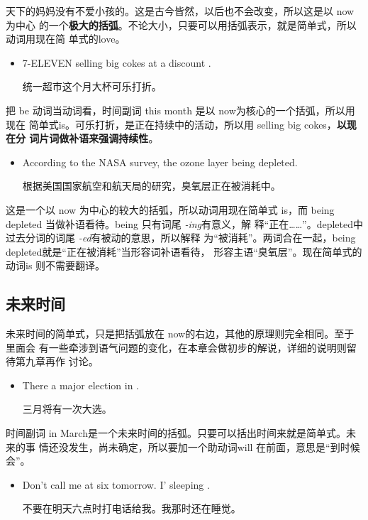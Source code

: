 天下的妈妈没有不爱小孩的。这是古今皆然，以后也不会改变，所以这是以 now为中心
的一个\textbf{极大的括弧}。不论大小，只要可以用括弧表示，就是简单式，所以动词用现在简
单式的love。

\begin{itemize}
\item  7-ELEVEN  selling big cokes at a discount .

  统一超市这个月大杯可乐打折。
\end{itemize}

把 be 动词当动词看，时间副词 this month 是以 now为核心的一个括弧，所以用现在
简单式is。可乐打折，是正在持续中的活动，所以用 selling big cokes，\textbf{以现在分
  词片词做补语来强调持续性}。

\begin{itemize}
\item According to the NASA survey, the ozone layer  being depleted.

  根据美国国家航空和航天局的研究，臭氧层正在被消耗中。
\end{itemize}

这是一个以 now 为中心的较大的括弧，所以动词用现在简单式 is，而 being
depleted 当做补语看待。being 只有词尾 \emph{-ing}有意义，解
释“正在……”。depleted中过去分词的词尾 \emph{-ed}有被动的意思，所以解释
为“被消耗”。两词合在一起，being depleted就是“正在被消耗”当形容词补语看待，
形容主语“臭氧层”。现在简单式的动词is 则不需要翻译。

\subsection{未来时间}

未来时间的简单式，只是把括弧放在 now的右边，其他的原理则完全相同。至于里面会
有一些牵涉到语气问题的变化，在本章会做初步的解说，详细的说明则留待第九章再作
讨论。

\begin{itemize}
\item  There  a major election in .

  三月将有一次大选。
\end{itemize}

时间副词 in March是一个未来时间的括弧。只要可以括出时间来就是简单式。未来的事
情还没发生，尚未确定，所以要加一个助动词will 在前面，意思是“到时候会”。

\begin{itemize}
\item  Don't call me at six tomorrow. I' sleeping
  .

  不要在明天六点时打电话给我。我那时还在睡觉。
\end{itemize}


